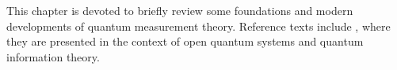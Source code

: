 
This chapter is devoted to briefly review some
foundations and modern developments of quantum measurement theory.
Reference texts include
\cite{PreskillNotes, Haroche_Exploring, Nakahara, NielsenChuang},
where they are presented in the context of
open quantum systems and quantum information theory.

